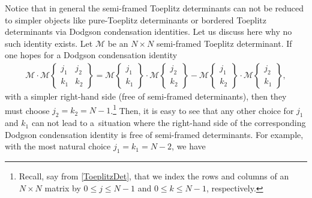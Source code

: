 \documentclass[pdftex]{sigma}
\numberwithin{equation}{section}
\begin{document}
		Notice that in general the semi-framed Toeplitz determinants can not be reduced to simpler objects like pure-Toeplitz determinants or bordered Toeplitz determinants via Dodgson condensation identities. Let us discuss here why no such identity exists. Let $\mathscr{M}$ be an $N \times N$ semi-framed Toeplitz determinant. If one hopes for a Dodgson condensation identity
		\begin{gather*}%
			\mathscr{M} \cdot \mathscr{M}\left\lbrace \begin{matrix} j_1 & j_2 \\ k_1& k_2 \end{matrix} \right\rbrace = \mathscr{M}\left\lbrace \begin{matrix} j_1 \\ k_1 \end{matrix} \right\rbrace \cdot \mathscr{M}\left\lbrace \begin{matrix} j_2 \\ k_2 \end{matrix} \right\rbrace - \mathscr{M}\left\lbrace \begin{matrix} j_1 \\ k_2 \end{matrix} \right\rbrace \cdot \mathscr{M}\left\lbrace \begin{matrix} j_2 \\ k_1 \end{matrix} \right\rbrace,
		\end{gather*}
		with a simpler right-hand side (free of semi-framed determinants), then they must choose $j_2=k_2=N-1$.\footnote{Recall, say from \eqref{ToeplitzDet}, that we index the rows and columns of an $N\times N$ matrix by $0 \leq j \leq N-1$ and $0 \leq k \leq N-1$, respectively.} Then, it is easy to see that any other choice for $j_1$ and $k_1$ can not lead to a~situation where the right-hand side of the corresponding Dodgson condensation identity is free of semi-framed determinants. For example, with the most natural choice $j_1=k_1=N-2$, we have
\end{document}

